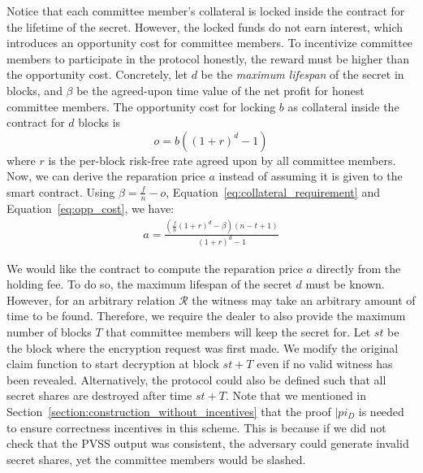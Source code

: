 Notice that each committee member's collateral is locked inside the contract for the lifetime of the secret.
However, the locked funds do not earn interest, which introduces an opportunity cost for committee members.
To incentivize committee members to participate in the protocol honestly, the reward must be higher than the opportunity cost.
Concretely, let $d$ be the \emph{maximum lifespan} of the secret in blocks, and $\beta$ be the agreed-upon time value of the net profit for honest committee members.
The opportunity cost for locking $b$ as collateral inside the contract for $d$ blocks is
\begin{equation}\label{eq:opp_cost}
    o = b((1 + r)^d - 1)
\end{equation}
where $r$ is the per-block risk-free rate agreed upon by all committee members.
Now, we can derive the reparation price $a$ instead of assuming it is given to the smart contract.
Using $\beta = \frac{f}{n} - o$, Equation~\ref{eq:collateral_requirement} and Equation~\ref{eq:opp_cost}, we have:
\begin{gather}\label{eq:collateral_from_holding_fee}
    a = \frac{(\frac{f}{n}(1 + r)^d - \beta)(n - t + 1)}{(1 + r)^d - 1}
\end{gather}

We would like the contract to compute the reparation price $a$ directly from the holding fee.
To do so, the maximum lifespan of the secret $d$ must be known.
However, for an arbitrary relation $\mathcal{R}$ the witness may take an arbitrary amount of time to be found.
Therefore, we require the dealer to also provide the maximum number of blocks $T$ that committee members will keep the secret for.
Let $st$ be the block where the encryption request was first made.
We modify the original \textsf{claim} function to start decryption at block $st + T$ even if no valid witness has been revealed.
Alternatively, the protocol could also be defined such that all secret shares are destroyed after time $st + T$.
Note that we mentioned in Section~\ref{section:construction_without_incentives} that the proof $|pi_D$ is needed to ensure correctness incentives in this scheme.
This is because if we did not check that the PVSS output was consistent, the adversary could generate invalid secret shares, yet the committee members would be slashed.

